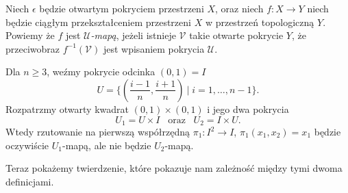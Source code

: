 \begin{defi} %
    Niech $\epsilon$ będzie otwartym pokryciem przestrzeni $X$, oraz niech $f:X\rightarrow Y$ niech będzie ciągłym przekształceniem przestrzeni $X$ w przestrzeń topologiczną $Y$.\\
    Powiemy że $f$ jest \emph{$\mathcal{U}$-mapą}, jeżeli istnieje $\mathcal{V}$ takie  otwarte pokrycie $Y$, że przeciwobraz $f^{-1}(\mathcal{V})$ jest wpisaniem pokrycia $\mathcal{U}$.
\end{defi}

\begin{przy}
    Dla $n\ge 3$, weźmy pokrycie odcinka $(0,1)=I$ 
    \[U=\{(\frac{i-1}{n}, \frac{i+1}{n})\:| \; i=1, \ldots, n-1\}.\]
    Rozpatrzmy otwarty kwadrat $(0,1)\times (0,1)$ i jego dwa pokrycia
    \[U_1 = U\times I\;\;\;\mathrm{oraz}\;\;\; U_2 = I\times U.\]
    Wtedy rzutowanie na pierwszą współrzędną $\pi_1:I^2\rightarrow I$, $\pi_1(x_1,x_2)=x_1$ będzie oczywiście $U_1$-mapą, ale nie będzie $U_2$-mapą. 
\end{przy}

Teraz pokażemy twierdzenie, które pokazuje nam zależność między tymi dwoma definicjami.


